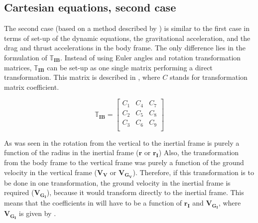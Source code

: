  
\subsection{Cartesian equations, second case}
\label{subsec:careq2}
The second case (based on a method described by \citep{bergsma2015application}) is similar to the first case in terms of set-up of the dynamic equations, the gravitational acceleration, and the drag and thrust accelerations in the body frame. The only difference lies in the formulation of $\mathbb{T}_{\mathbf{IB}}$. Instead of using Euler angles and rotation transformation matrices, $\mathbb{T}_{\mathbf{IB}}$ can be set-up as one single matrix performing a direct transformation. This matrix is described in , where $C$ stands for transformation matrix coefficient. 

\begin{equation} \label{eq:transMatCoef}
\mathbb{T}_{\mathbf{IB}} = 
\left[
\begin{matrix}
C_{1} & C_{4} & C_{7} \\
C_{2} & C_{5} & C_{8} \\
C_{3} & C_{6} & C_{9} \\
\end{matrix}
\right]
\end{equation}


As was seen in  the rotation from the vertical to the inertial frame is purely a function of the radius in the inertial frame ($\mathbf{r}$ or $\mathbf{r_{I}}$) Also, the transformation from the body frame to the vertical frame was purely a function of the ground velocity in the vertical frame ($\mathbf{V_{V}}$ or $\mathbf{V_{G_{V}}}$). Therefore, if this transformation is to be done in one transformation, the ground velocity in the inertial frame is required ($\mathbf{V_{G_{I}}}$), because it would transform directly to the inertial frame. This means that the coefficients in  will have to be a function of $\mathbf{r_{I}}$ and $\mathbf{V_{G_{I}}}$, where $\mathbf{V_{G_{I}}}$ is given by .

